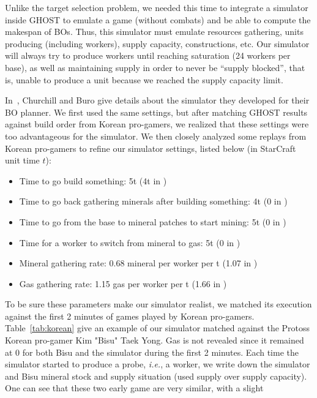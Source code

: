 \documentclass[journal]{IEEEtran}
\newcommand{\ghost}{\textsc{GHOST}\xspace}
\newcommand{\ie}{\textit{i.e.}}
\begin{document}
Unlike the target selection problem,  we needed this time to integrate
a simulator inside  \ghost to emulate a game (without  combats) and be
able to  compute the  makespan of BOs. Thus,  this simulator
must emulate resources gathering, units producing (including workers),
supply capacity, constructions, etc.  Our simulator will always try to
produce workers  until reaching saturation  (24 workers per  base), as
well as  maintaining supply in  order to never be  ``supply blocked'',
that  is, unable  to  produce a  unit because  we  reached the  supply
capacity limit.

In~\cite{ChurchillB11},  Churchill and  Buro  give  details about  the
simulator they developed for their BO planner.  We first used
the same  settings, but  after matching  \ghost results  against build
order from Korean pro-gamers, we realized that these settings were too
advantageous for the simulator.  We then closely analyzed some replays
from Korean pro-gamers to refine  our simulator settings, listed below
(in StarCraft unit time $t$):
\begin{itemize}
\item Time to go build something: 5t (4t in \cite{ChurchillB11})
\item Time to go back  gathering minerals after building something: 4t
  (0 in \cite{ChurchillB11})
\item Time to go from the base  to mineral patches to start mining: 5t
  (0 in \cite{ChurchillB11})
\item  Time for  a worker  to  switch from  mineral  to gas:  5t (0  in
  \cite{ChurchillB11})
\item Mineral gathering  rate: 0.68 mineral per worker per  t (1.07 in
  \cite{ChurchillB11})
\item  Gas  gathering  rate:  1.15  gas per  worker  per  t  (1.66  in
  \cite{ChurchillB11})
\end{itemize}  
To be sure these parameters make our simulator realist, we matched its
execution  against the  first  2  minutes of  games  played by  Korean
pro-gamers. Table~\ref{tab:korean}  give an  example of  our simulator
matched against the Protoss Korean pro-gamer Kim "Bisu" Taek Yong. Gas
is not revealed since it remained at 0 for both Bisu and the simulator
during the first 2 minutes. Each time the simulator started to produce
a probe, \ie,  a worker, we write down the  simulator and Bisu mineral
stock and supply situation (used supply over supply capacity). One can
see  that  these two  early  game  are  very  similar, with  a  slight
\end{document}
